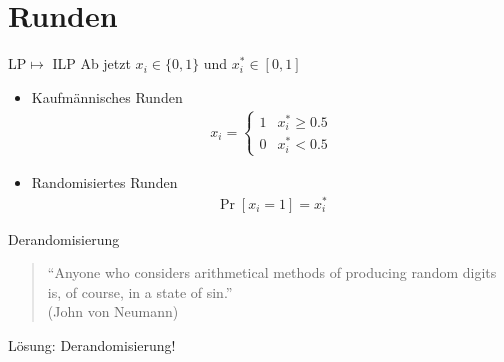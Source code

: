 \documentclass{beamer}
\newcommand{\set}[1]{\{#1\}}
\begin{document}
\section{Runden}
\begin{frame}{LP$\mapsto$ ILP}
  \alert{Ab jetzt $x_{i}\in \set{0,1}$ und $x_{i}^{*}\in [0,1]$}
  \pause
  \begin{itemize}
  \item Kaufmännisches Runden
    \begin{align*}
      x_{i}=
      \begin{cases}
        1 & x_{i}^{*}\geq 0.5\\
        0 & x_{i}^{*} < 0.5
      \end{cases}
    \end{align*}
    \pause
  \item Randomisiertes Runden
    \begin{align*}
      \Pr[x_{i}=1]=x^{*}_{i}
    \end{align*}
  \end{itemize}
\end{frame}
\begin{frame}{Derandomisierung}
  \begin{quote}
    ``Anyone who considers arithmetical methods of producing random
    digits is, of course, in a state of sin.''\\
    (John von Neumann)
  \end{quote}\pause
  Lösung: Derandomisierung!
\end{frame}
\end{document}
